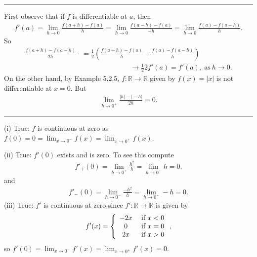 \documentclass[letterpaper,10pt,english]{jupyterBook}
\begin{document}
\bigskip\hrule\bigskip


\sphinxAtStartPar
{\hyperref[\detokenize{Problems:id45}]{}} First observe that if \(f\) is differentiable at \(a\), then
\begin{equation*}
\begin{split}
f'(a) = \lim_{h \rightarrow 0}\frac{f(a + h) - f(a)}{h} = \lim_{h \rightarrow 0}\frac{f(a - h) - f(a)}{-h} = \lim_{h \rightarrow 0}\frac{f(a) - f(a-h)}{h}.
\end{split}
\end{equation*}
\sphinxAtStartPar
So
\begin{align*}
\frac{f(a+ h) - f(a - h)}{2h} &=  \frac{1}{2}\left(\frac{f(a + h) - f(a)}{h} +  \frac{f(a) - f(a-h)}{h}\right) \\
&\hspace{7em}\rightarrow  \frac{1}{2}2f'(a) = f'(a),~\mbox{as}~h \rightarrow 0. 
\end{align*}
\sphinxAtStartPar
On the other hand, by Example 5.2.5, \(f:\mathbb{R}\to\mathbb{R}\) given by
\(f(x)=|x|\) is not differentiable at \(x=0\). But
\begin{equation*}
\begin{split}
\lim_{h \rightarrow 0^+} \displaystyle\frac{|h|-|{}-h|}{2h} =0.
\end{split}
\end{equation*}

\bigskip\hrule\bigskip


\sphinxAtStartPar
{\hyperref[\detokenize{Problems:id46}]{}}
(i) True: \(f\) is continuous at zero as \(f(0) = 0= \lim_{x \rightarrow 0^-}f(x) = \lim_{x \rightarrow 0^+}f(x)\).

\sphinxAtStartPar
(ii) True: \(f'(0)\) exists and is zero. To see this compute
\begin{equation*}
\begin{split}
f'_{+}(0) = \lim_{h \rightarrow 0^+}\frac{h^{2}}{h} = \lim_{h \rightarrow 0^+} h= 0.
\end{split}
\end{equation*}
\sphinxAtStartPar
and
\begin{equation*}
\begin{split}
f'_{-}(0)= \lim_{h \rightarrow 0^-}\frac{-h^{2}}{h} = \lim_{h \rightarrow 0^-} -h =0.
\end{split}
\end{equation*}
\sphinxAtStartPar
(iii) True: \(f'\) is continuous at zero since \(f':\mathbb{R}\to\mathbb{R}\) is given by
\begin{equation*}
\begin{split}
f'(x) = \left\{\begin{array}{c c} -2x & ~\mbox{if}~x < 0\\ 0& ~\mbox{if}~x =0 \\ 2x & ~\mbox{if}~x > 0 \end{array} \right.,
\end{split}
\end{equation*}
\sphinxAtStartPar
so \(f'(0) = \lim_{x \rightarrow 0^-} f'(x) = \lim_{x \rightarrow 0^+}f'(x) = 0\).
\end{document}
